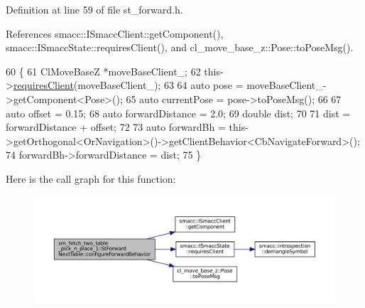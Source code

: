 Definition at line 59 of file st\+\_\+forward.\+h.



References smacc\+::\+I\+Smacc\+Client\+::get\+Component(), smacc\+::\+I\+Smacc\+State\+::requires\+Client(), and cl\+\_\+move\+\_\+base\+\_\+z\+::\+Pose\+::to\+Pose\+Msg().


\begin{DoxyCode}
60     \{
61       ClMoveBaseZ *moveBaseClient\_;
62       this->\hyperlink{classsmacc_1_1ISmaccState_a7f95c9f0a6ea2d6f18d1aec0519de4ac}{requiresClient}(moveBaseClient\_);
63 
64       \textcolor{keyword}{auto} pose = moveBaseClient\_->getComponent<Pose>();
65       \textcolor{keyword}{auto} currentPose = pose->toPoseMsg();
66 
67       \textcolor{keyword}{auto} offset = 0.15;
68       \textcolor{keyword}{auto} forwardDistance = 2.0;
69       \textcolor{keywordtype}{double} dist;
70 
71       dist = forwardDistance + offset;
72 
73       \textcolor{keyword}{auto} forwardBh = this->getOrthogonal<OrNavigation>()->getClientBehavior<CbNavigateForward>();
74       forwardBh->forwardDistance = dist;
75     \}
\end{DoxyCode}
Here is the call graph for this function\+:
\nopagebreak
\begin{figure}[H]
\begin{center}
\leavevmode
\includegraphics[width=350pt]{structsm__fetch__two__table__pick__n__place__1_1_1StForwardNextTable_ae2358c473474c13a9cf8c017ec7e7735_cgraph}
\end{center}
\end{figure}
\mbox{\label{structsm__fetch__two__table__pick__n__place__1_1_1StForwardNextTable_a7b7d04ab57af4686b394afda86c891af}} 
